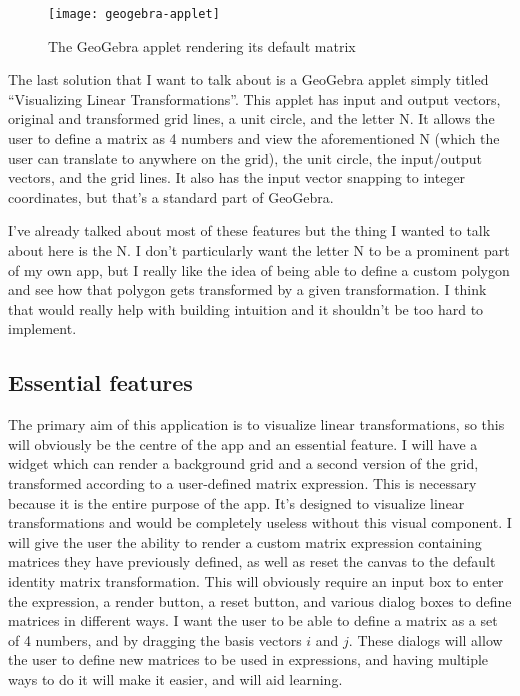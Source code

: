 \documentclass[../main.tex]{subfiles}
\begin{document}
\begin{wrapfigure}{L}{0.5\linewidth}
	\vspace{-1em}
	\centering
	\texttt{[image: geogebra-applet]}
	\caption{The GeoGebra applet rendering its default matrix}
	\label{fig:geogebra-applet}
\end{wrapfigure}

The last solution that I want to talk about is a GeoGebra applet simply titled \enquote{Visualizing Linear Transformations}\cite{geogebra-applet}. This applet has input and output vectors, original and transformed grid lines, a unit circle, and the letter N. It allows the user to define a matrix as 4 numbers and view the aforementioned N (which the user can translate to anywhere on the grid), the unit circle, the input/output vectors, and the grid lines. It also has the input vector snapping to integer coordinates, but that's a standard part of GeoGebra.

I've already talked about most of these features but the thing I wanted to talk about here is the N. I don't particularly want the letter N to be a prominent part of my own app, but I really like the idea of being able to define a custom polygon and see how that polygon gets transformed by a given transformation. I think that would really help with building intuition and it shouldn't be too hard to implement.

\subsection{Essential features\label{subsection:essential-features}}

The primary aim of this application is to visualize linear transformations, so this will obviously be the centre of the app and an essential feature. I will have a widget which can render a background grid and a second version of the grid, transformed according to a user-defined matrix expression. This is necessary because it is the entire purpose of the app. It's designed to visualize linear transformations and would be completely useless without this visual component. I will give the user the ability to render a custom matrix expression containing matrices they have previously defined, as well as reset the canvas to the default identity matrix transformation. This will obviously require an input box to enter the expression, a render button, a reset button, and various dialog boxes to define matrices in different ways. I want the user to be able to define a matrix as a set of 4 numbers, and by dragging the basis vectors $i$ and $j$. These dialogs will allow the user to define new matrices to be used in expressions, and having multiple ways to do it will make it easier, and will aid learning.
\end{document}
